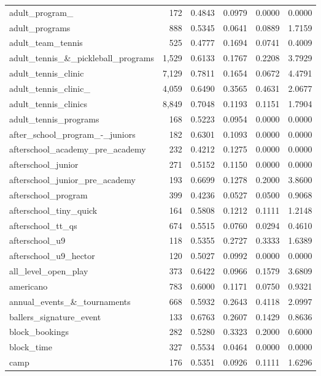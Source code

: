 \begin{table}[htbp]
\begin{tabular}{lrrrrr}
  adult\_program\_ & 172 & 0.4843 & 0.0979 & 0.0000 & 0.0000 \\
  adult\_programs & 888 & 0.5345 & 0.0641 & 0.0889 & 1.7159 \\
  adult\_team\_tennis & 525 & 0.4777 & 0.1694 & 0.0741 & 0.4009 \\
  adult\_tennis\_\&\_pickleball\_programs & 1,529 & 0.6133 & 0.1767 & 0.2208 & 3.7929 \\
  adult\_tennis\_clinic & 7,129 & 0.7811 & 0.1654 & 0.0672 & 4.4791 \\
  adult\_tennis\_clinic\_ & 4,059 & 0.6490 & 0.3565 & 0.4631 & 2.0677 \\
  adult\_tennis\_clinics & 8,849 & 0.7048 & 0.1193 & 0.1151 & 1.7904 \\
  adult\_tennis\_programs & 168 & 0.5223 & 0.0954 & 0.0000 & 0.0000 \\
  after\_school\_program\_-\_juniors & 182 & 0.6301 & 0.1093 & 0.0000 & 0.0000 \\
  afterschool\_academy\_pre\_academy & 232 & 0.4212 & 0.1275 & 0.0000 & 0.0000 \\
  afterschool\_junior & 271 & 0.5152 & 0.1150 & 0.0000 & 0.0000 \\
  afterschool\_junior\_pre\_academy & 193 & 0.6699 & 0.1278 & 0.2000 & 3.8600 \\
  afterschool\_program & 399 & 0.4236 & 0.0527 & 0.0500 & 0.9068 \\
  afterschool\_tiny\_quick & 164 & 0.5808 & 0.1212 & 0.1111 & 1.2148 \\
  afterschool\_tt\_qs & 674 & 0.5515 & 0.0760 & 0.0294 & 0.4610 \\
  afterschool\_u9 & 118 & 0.5355 & 0.2727 & 0.3333 & 1.6389 \\
  afterschool\_u9\_hector & 120 & 0.5027 & 0.0992 & 0.0000 & 0.0000 \\
  all\_level\_open\_play & 373 & 0.6422 & 0.0966 & 0.1579 & 3.6809 \\
  americano & 783 & 0.6000 & 0.1171 & 0.0750 & 0.9321 \\
  annual\_events\_\&\_tournaments & 668 & 0.5932 & 0.2643 & 0.4118 & 2.0997 \\
  ballers\_signature\_event & 133 & 0.6763 & 0.2607 & 0.1429 & 0.8636 \\
  block\_bookings & 282 & 0.5280 & 0.3323 & 0.2000 & 0.6000 \\
  block\_time & 327 & 0.5534 & 0.0464 & 0.0000 & 0.0000 \\
  camp & 176 & 0.5351 & 0.0926 & 0.1111 & 1.6296 \\

\end{tabular}
\end{table}
